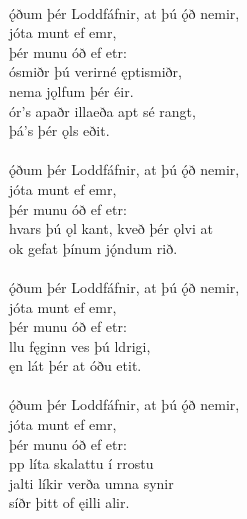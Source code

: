  \\

\bva {}ǫ́ðum þér Loddfáfnir, \hld at þú ǫ́ð nemir, \\%
\ind {}jóta munt ef emr, \\%
\ind þér munu óð ef etr: \\%
ósmiðr þú verir\hld né ęptismiðr, \\%
\ind nema jǫlfum þér éir. \\%
ór's apaðr illa\hld eða apt sé rangt, \\%
\ind þá's þér ǫls eðit.\\%

 \\

\bva {}ǫ́ðum þér Loddfáfnir, \hld at þú ǫ́ð nemir, \\%
\ind {}jóta munt ef emr, \\%
\ind þér munu óð ef etr: \\%
hvars þú ǫl kant, \hld kveð þér ǫlvi at \\%
\ind ok gefat þínum jǫ́ndum rið.\\%

 \\

\bva {}ǫ́ðum þér Loddfáfnir, \hld at þú ǫ́ð nemir, \\%
\ind {}jóta munt ef emr, \\%
\ind þér munu óð ef etr: \\%
llu fęginn \hld ves þú ldrigi, \\%
\ind ęn lát þér at óðu etit.\\%

 \\

\bva {}ǫ́ðum þér Loddfáfnir, \hld at þú ǫ́ð nemir, \\%
\ind {}jóta munt ef emr, \\%
\ind þér munu óð ef etr: \\%
pp líta \hld skalattu í rrostu \\%
jalti líkir \hld verða umna synir \\%
\ind síðr þitt of ęilli alir.\\%

